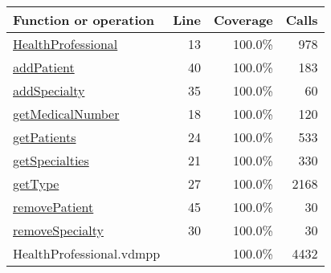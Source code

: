 \begin{longtable}{|l|r|r|r|}
\hline
Function or operation & Line & Coverage & Calls \\
\hline
\hline
\hyperref[HealthProfessional:13]{HealthProfessional} & 13&100.0\% & 978 \\
\hline
\hyperref[addPatient:40]{addPatient} & 40&100.0\% & 183 \\
\hline
\hyperref[addSpecialty:35]{addSpecialty} & 35&100.0\% & 60 \\
\hline
\hyperref[getMedicalNumber:18]{getMedicalNumber} & 18&100.0\% & 120 \\
\hline
\hyperref[getPatients:24]{getPatients} & 24&100.0\% & 533 \\
\hline
\hyperref[getSpecialties:21]{getSpecialties} & 21&100.0\% & 330 \\
\hline
\hyperref[getType:27]{getType} & 27&100.0\% & 2168 \\
\hline
\hyperref[removePatient:45]{removePatient} & 45&100.0\% & 30 \\
\hline
\hyperref[removeSpecialty:30]{removeSpecialty} & 30&100.0\% & 30 \\
\hline
\hline
HealthProfessional.vdmpp & & 100.0\% & 4432 \\
\hline
\end{longtable}

